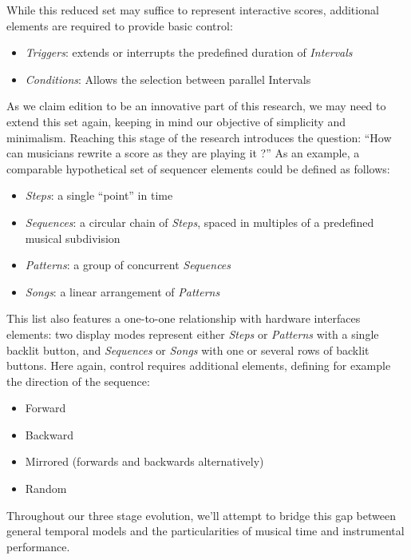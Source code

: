 \documentclass[journal,onecolumn]{IEEEtran}
\begin{document}
While this reduced set may suffice to represent interactive scores, additional elements are required to provide basic control:
\begin{itemize}
    \item \textit{Triggers}: extends or interrupts the predefined duration of \textit{Intervals}
    \item \textit{Conditions}: Allows the selection between parallel Intervals
\end{itemize}
As we claim edition to be an innovative part of this research, we may need to extend this set again, keeping in mind our objective of simplicity and minimalism. Reaching this stage of the research introduces the question: ``How can musicians rewrite a score as they are playing it ?''
As an example, a comparable hypothetical set of sequencer elements could be defined as follows:
\begin{itemize}
    \item \textit{Steps}: a single ``point'' in time
    \item \textit{Sequences}: a circular chain of \textit{Steps}, spaced in multiples of a predefined musical subdivision
    \item \textit{Patterns}: a group of concurrent \textit{Sequences}
    \item \textit{Songs}: a linear arrangement of \textit{Patterns}
\end{itemize}
This list also features a one-to-one relationship with hardware interfaces elements: two display modes represent either \textit{Steps} or \textit{Patterns} with a single backlit button, and \textit{Sequences} or \textit{Songs} with one or several rows of backlit buttons.
Here again, control requires additional elements, defining for example the direction of the sequence:
\begin{itemize}
    \item Forward
    \item Backward
    \item Mirrored (forwards and backwards alternatively)
    \item Random
\end{itemize}
Throughout our three stage evolution, we'll attempt to bridge this gap between general temporal models and the particularities of musical time and instrumental performance. 

\end{document}
